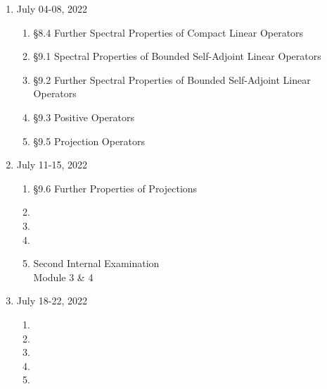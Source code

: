 \begin{enumerate}[label=Week \arabic*]
	\begin{enumerate}[label=Day \arabic*]
		\item 
			\S7.6 Banach Algebras
		\item 
			\S7.7 Further Properties of Banach Algebras
		\item 
			\S8.1 Compact Linear Operators on Normed Spaces
		\item 
			\S8.2 Further Properties of Compact Linear Operators
		\item 
			\S8.3 Spectral Properties of Compact Linear Operators
	\end{enumerate}
	\item July 04-08, 2022 
	\begin{enumerate}[label=Day \arabic*]
		\item 
			\S8.4 Further Spectral Properties of Compact Linear Operators
		\item  
			\S9.1 Spectral Properties of Bounded Self-Adjoint Linear Operators
		\item 
			\S9.2 Further Spectral Properties of Bounded Self-Adjoint Linear Operators
		\item 
			\S9.3 Positive Operators
		\item 
			\S9.5 Projection Operators
	\end{enumerate}
	\item July 11-15, 2022 
	\begin{enumerate}[label=Day \arabic*]
		\item 
			\S9.6 Further Properties of Projections
		\item 

		\item 

		\item 

		\item 
			Second Internal Examination \\
			Module 3 \& 4
	\end{enumerate}
	\item July 18-22, 2022 
	\begin{enumerate}[label=Day \arabic*]
		\item 

		\item 

		\item 

		\item 

		\item 


\end{enumerate}
\end{enumerate}
